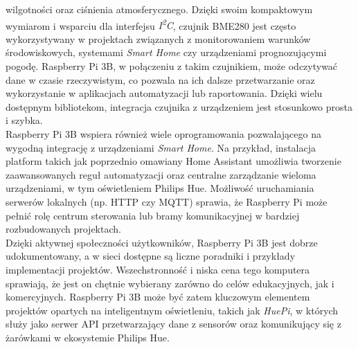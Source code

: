 \documentclass[12pt]{article}
\begin{document}
wilgotności oraz ciśnienia atmosferycznego. Dzięki swoim kompaktowym wymiarom i wsparciu dla interfejsu \textit{I\textsuperscript{2}C},
czujnik BME280 jest często wykorzystywany w projektach związanych z monitorowaniem warunków środowiskowych, systemami \textit{Smart Home}
czy urządzeniami prognozującymi pogodę. Raspberry Pi 3B, w połączeniu z takim czujnikiem, może odczytywać dane w czasie rzeczywistym,
co pozwala na ich dalsze przetwarzanie oraz wykorzystanie w aplikacjach automatyzacji lub raportowania. Dzięki wielu dostępnym bibliotekom,
integracja czujnika z urządzeniem jest stosunkowo prosta i szybka.\\
Raspberry Pi 3B wspiera również wiele oprogramowania pozwalającego na wygodną integrację z urządzeniami \textit{Smart Home}.
Na przykład, instalacja platform takich jak poprzednio omawiany Home Assistant umożliwia tworzenie zaawansowanych reguł automatyzacji
oraz centralne zarządzanie wieloma urządzeniami, w tym oświetleniem Philips Hue. Możliwość uruchamiania serwerów lokalnych (np. HTTP czy MQTT) sprawia,
że Raspberry Pi może pełnić rolę centrum sterowania lub bramy komunikacyjnej w bardziej rozbudowanych projektach.\\
Dzięki aktywnej społeczności użytkowników, Raspberry Pi 3B jest dobrze udokumentowany, a w sieci dostępne są liczne poradniki i przykłady implementacji projektów.
Wszechstronność i niska cena tego komputera sprawiają, że jest on chętnie wybierany zarówno do celów edukacyjnych, jak i komercyjnych.
Raspberry Pi 3B może być zatem kluczowym elementem projektów opartych na inteligentnym oświetleniu, takich jak \textit{HuePi},
w których służy jako serwer API przetwarzający dane z sensorów oraz komunikujący się z żarówkami w ekosystemie Philips Hue.
\end{document}
